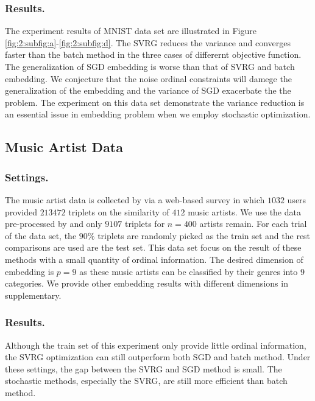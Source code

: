 \documentclass[letterpaper]{article}
\newcommand{\qqxu}[1]{\textcolor[rgb]{0.00,1.00,0.00}{#1}}
\begin{document}
		\subsubsection{Results.}
		The experiment results of MNIST data set are illustrated in Figure \ref{fig:2:subfig:a}-\ref{fig:2:subfig:d}. The SVRG reduces the variance and  converges faster than the batch method in the three cases of differernt objective function. The generalization of SGD embedding is worse than that of SVRG and batch embedding. We conjecture that the noise ordinal constraints will damege the generalization of the embedding and the variance of SGD exacerbate the the problem. The experiment on this data set demonstrate the variance reduction is an essential issue in embedding problem when we employ stochastic optimization.

		\subsection{Music Artist Data}
		\subsubsection{Settings.}
		The music artist data is collected by \cite{ellis2002quest} via a web-based survey in which $1032$ users provided $213472$ triplets on the similarity of $412$ music artists. We use the data pre-processed by \cite{vandermaaten2012stochastic} and only $9107$ triplets for $n=400$ artists remain. For each trial of the data set, the $90\%$ triplets are randomly picked as the train set and the rest comparisons are used are the test set. This data set focus on the result of these methods with a small quantity of ordinal information. The desired dimension of embedding is $p = 9$ as these music artists can be classified by their genres into $9$ categories. We provide other embedding results with different dimensions in supplementary.
		\subsubsection{Results.}
		Although the train set of this experiment only provide little ordinal information, the SVRG optimization can still outperform both SGD and batch method. Under these settings, the gap between the SVRG and SGD method is small. The stochastic methods, especially the SVRG, are still more efficient than batch method.

\end{document}

